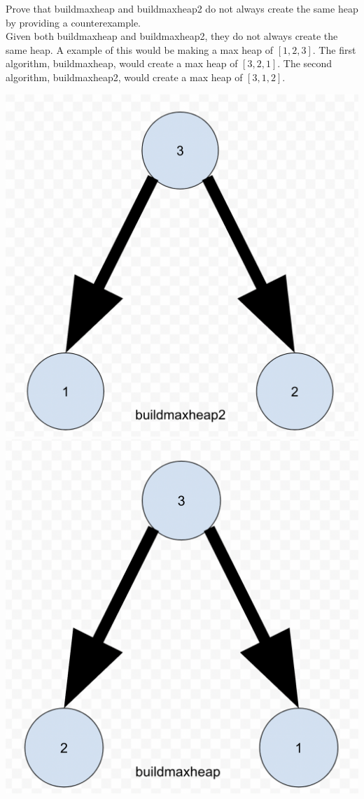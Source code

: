 \documentclass[12pt,letterpaper]{article}
\begin{document}
\begin{enumerate}
Prove that buildmaxheap and buildmaxheap2 do not always create the same heap by providing a counterexample.
\\[14pt]
Given both buildmaxheap and buildmaxheap2, they do 
not always create the same heap. A example of this would be 
making a max heap of $[1,2,3]$. The first algorithm, buildmaxheap,
would create a max heap of $[3,2,1]$. The second algorithm, buildmaxheap2,
would create a max heap of $[3,1,2]$.\\
\begin{center}
    \includegraphics[scale=.25]{images/buildmaxheap.png}
    \includegraphics[scale=.25]{images/buildmaxheap2.png}

\end{center}
\end{enumerate}
\end{document}
